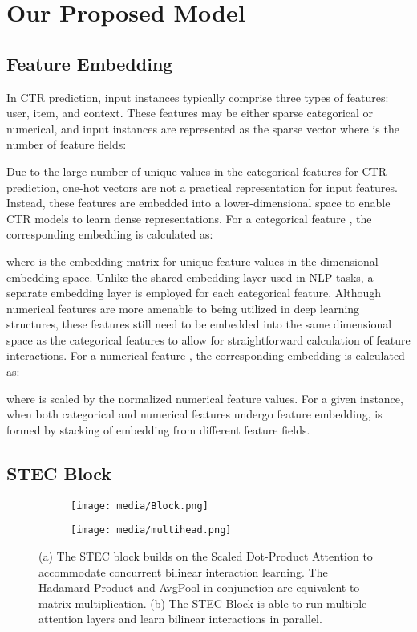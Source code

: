 \documentclass{article}
\begin{document}
\section{Our Proposed Model}

\subsection{Feature Embedding}
In CTR prediction, input instances typically comprise three types of features: user, item, and context. These features may be either sparse categorical or numerical, and input instances are represented as the sparse vector  where  is the number of feature fields:

Due to the large number of unique values in the categorical features for CTR prediction, one-hot vectors are not a practical representation for input features. Instead, these features are embedded into a lower-dimensional space to enable CTR models to learn dense representations. For a categorical feature , the corresponding embedding is calculated as:     

where  is the embedding matrix for  unique feature values in the  dimensional embedding space. Unlike the shared embedding layer used in NLP tasks, a separate embedding layer is employed for each categorical feature.
Although numerical features are more amenable to being utilized in deep learning structures, these features still need to be embedded into the same dimensional space as the categorical features to allow for straightforward calculation of feature interactions. For a numerical feature  , the corresponding embedding is calculated as:

where  is scaled by the normalized numerical feature values.
For a given instance, when both categorical and numerical features undergo feature embedding,  is formed by stacking of embedding  from different feature fields. 

\subsection{STEC Block}

\begin{figure}
     \centering
     \begin{subfigure}[b]{0.45\textwidth}
         \centering
         \texttt{[image: media/Block.png]}
         \caption{}
         \label{fig:stec_block}
     \end{subfigure}
     \hfill
     \begin{subfigure}[b]{0.45\textwidth}
         \centering
         \texttt{[image: media/multihead.png]}
         \caption{}
         \label{fig:multihead}
     \end{subfigure}
        \caption{(a) The STEC block builds on the Scaled Dot-Product Attention to accommodate concurrent bilinear interaction learning. The Hadamard Product and AvgPool in conjunction are equivalent to matrix multiplication. (b) The STEC Block is able to run multiple attention layers and learn bilinear interactions in parallel.}
        \label{fig:inner_blocks}
\end{figure}
\end{document}
